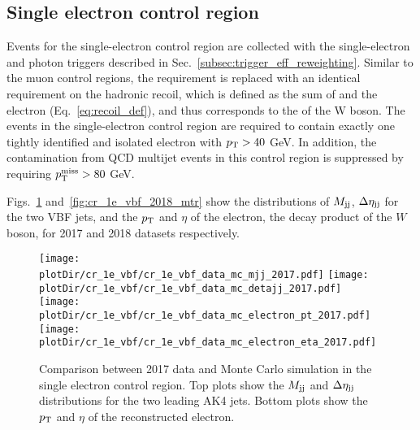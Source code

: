\clearpage

\subsection{Single electron control region}
\label{sec:selection_cr_1e}

Events for the single-electron control region are collected with the single-electron and photon triggers described in Sec.~\ref{subsec:trigger_eff_reweighting}.
Similar to the muon control regions, the \ptmiss requirement is replaced with an identical requirement on the hadronic recoil, which is defined as the sum of \ptvecmiss 
and the electron \vpt (Eq.~\ref{eq:recoil_def}), and thus corresponds to the \pt of the W boson.
The events in the single-electron control region are required to contain exactly one tightly identified and isolated electron with $p_{\textrm{T}} > 40$ GeV.
In addition, the contamination from QCD multijet events in this control region is suppressed by requiring $p_{\textrm{T}}^{\textrm{miss}} > 80$ GeV.

Figs.~\ref{fig:cr_1e_vbf_2017_mtr} and~\ref{fig:cr_1e_vbf_2018_mtr} show the distributions of $M_{\textrm{jj}}$, $\Delta \eta_{\textrm{jj}}$ for the two VBF jets,
and the $p_{\textrm{T}}$ and $\eta$ of the electron, the decay product of the $W$ boson, for 2017 and 2018 datasets respectively.

\begin{figure}[htbp]
    \begin{center}
        \texttt{[image: \\plotDir/cr\_1e\_vbf/cr\_1e\_vbf\_data\_mc\_mjj\_2017.pdf]}
        \texttt{[image: \\plotDir/cr\_1e\_vbf/cr\_1e\_vbf\_data\_mc\_detajj\_2017.pdf]} \\
        \texttt{[image: \\plotDir/cr\_1e\_vbf/cr\_1e\_vbf\_data\_mc\_electron\_pt\_2017.pdf]}
        \texttt{[image: \\plotDir/cr\_1e\_vbf/cr\_1e\_vbf\_data\_mc\_electron\_eta\_2017.pdf]}
    \end{center}
    \caption{Comparison between 2017 data and Monte Carlo simulation in the single electron control region. Top plots
    show the $M_{\textrm{jj}}$ and $\Delta \eta_{\textrm{jj}}$ distributions for the two leading AK4 jets. Bottom plots show the $p_{\textrm{T}}$ and $\eta$
    of the reconstructed electron.}
    \label{fig:cr_1e_vbf_2017_mtr}
\end{figure}

